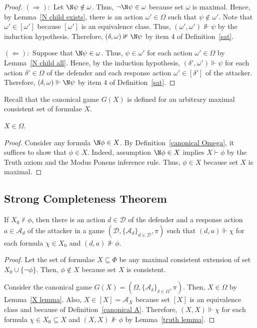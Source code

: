\documentclass[letterpaper]{article}
\begin{document}
\begin{proof}
\noindent$(\Rightarrow):$  Let $\N\psi\notin \omega$. Thus, $\neg\N\psi\in\omega$ because set $\omega$ is maximal. Hence, by Lemma~\ref{N child exists}, there is an action $\omega'\in\Omega$ such that $\psi\notin\omega'$. Note that $\omega'\in[\omega']$ because $[\omega']$ is an equivalence class. Thus, $(\omega',\omega')\nVdash\psi$ by the induction hypothesis. Therefore, $(\delta,\omega)\nVdash\N\psi$ by item 4 of Definition~\ref{sat}.

\noindent$(\Leftarrow):$ Suppose that $\N\psi\in \omega$. Thus, $\psi\in \omega'$ for each action $\omega'\in\Omega$ by Lemma~\ref{N child all}. Hence, by the induction hypothesis, $(\delta',\omega')\Vdash\psi$ for each action $\delta'\in\Omega$ of the defender and each response action $\omega'\in[\delta']$ of the attacker. Therefore, $(\delta,\omega)\Vdash\N\psi$ by item 4 of Definition~\ref{sat}.
\end{proof}

Recall that the canonical game $G(X)$ is defined for an arbitrary maximal consistent set of formulae $X$.

\begin{lemma}\label{X lemma}
$X\in \Omega$.
\end{lemma}
\begin{proof}
Consider any formula $\N\phi\in X$. By Definition~\ref{canonical Omega}, it suffices to show that $\phi\in X$. Indeed, assumption $\N\phi\in X$ implies $X\vdash\phi$ by the Truth axiom and the Modus Ponens inference rule. Thus, $\phi\in X$ because set $X$ is maximal.
\end{proof}

\subsection{Strong Completeness Theorem}

\begin{theorem}
If $X_0\nvdash\phi$, then there is an action $d\in\mathcal{D}$ of the defender and a response action $a\in\mathcal{A}_d$ of the attacker in a game $(\mathcal{D},\{\mathcal{A}_d\}_{d\in\mathcal{D}},\pi)$ such that $(d,a)\Vdash\chi$ for each formula $\chi\in X_0$ and $(d,a)\nVdash\phi$.
\end{theorem}
\begin{proof}
Let the set of formulae $X\subseteq\Phi$ be any maximal consistent extension of set $X_0\cup\{\neg\phi\}$. Then, $\phi\notin X$ because set $X$ is consistent.

Consider the canonical game $G(X)=(\Omega,\{\mathcal{A}_\delta\}_{\delta\in\Omega},\pi)$. Then, $X\in\Omega$ by Lemma~\ref{X lemma}. Also, $X\in[X]=\mathcal{A}_X$ because set $[X]$ is an equivalence class and because of Definition~\ref{canonical A}. Therefore, $(X,X)\Vdash\chi$ for each formula $\chi\in X_0\subseteq X$ and $(X,X)\nVdash\phi$ by Lemma~\ref{truth lemma}.
\end{proof}
\end{document}
